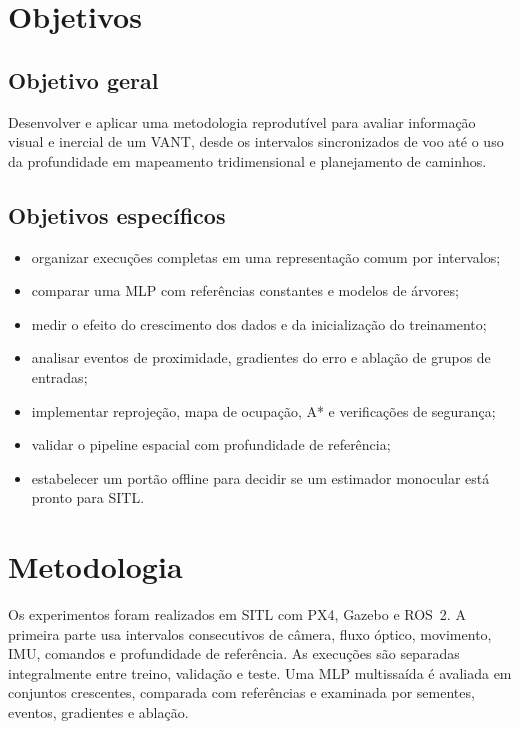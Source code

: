 \section{Objetivos}

\subsection{Objetivo geral}

Desenvolver e aplicar uma metodologia reprodutível para avaliar informação visual e inercial de um VANT, desde os intervalos sincronizados de voo até o uso da profundidade em mapeamento tridimensional e planejamento de caminhos.

\subsection{Objetivos específicos}

\begin{itemize}
    \item organizar execuções completas em uma representação comum por intervalos;
    \item comparar uma MLP com referências constantes e modelos de árvores;
    \item medir o efeito do crescimento dos dados e da inicialização do treinamento;
    \item analisar eventos de proximidade, gradientes do erro e ablação de grupos de entradas;
    \item implementar reprojeção, mapa de ocupação, A* e verificações de segurança;
    \item validar o pipeline espacial com profundidade de referência;
    \item estabelecer um portão offline para decidir se um estimador monocular está pronto para SITL.
\end{itemize}

\section{Metodologia}

Os experimentos foram realizados em SITL com PX4, Gazebo e ROS~2. A primeira parte usa intervalos consecutivos de câmera, fluxo óptico, movimento, IMU, comandos e profundidade de referência. As execuções são separadas integralmente entre treino, validação e teste. Uma MLP multissaída é avaliada em conjuntos crescentes, comparada com referências e examinada por sementes, eventos, gradientes e ablação.

